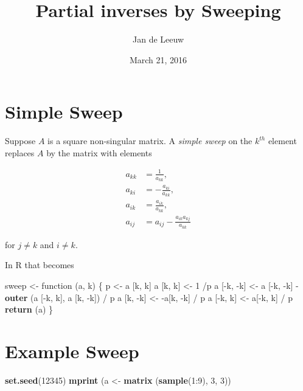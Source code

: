 \documentclass[]{article}
\title{Partial inverses by Sweeping}
\author{Jan de Leeuw}
\date{March 21, 2016}
\newenvironment{Shaded}{\begin{snugshade}}{\end{snugshade}}
\newcommand{\KeywordTok}[1]{\textcolor[rgb]{0.13,0.29,0.53}{\textbf{{#1}}}}
\newcommand{\DecValTok}[1]{\textcolor[rgb]{0.00,0.00,0.81}{{#1}}}
\newcommand{\StringTok}[1]{\textcolor[rgb]{0.31,0.60,0.02}{{#1}}}
\newcommand{\NormalTok}[1]{{#1}}
\begin{document}
\maketitle

{
\setcounter{tocdepth}{2}
\tableofcontents
}
\section{Simple Sweep}\label{simple-sweep}

Suppose \(A\) is a square non-singular matrix. A \emph{simple sweep} on
the \(k^{th}\) element replaces \(A\) by the matrix with elements

\begin{align*}
a_{kk}&=\frac{1}{a_{kk}},\\
a_{ki}&=-\frac{a_{ki}}{a_{kk}},\\
a_{ik}&=\frac{a_{ik}}{a_{kk}},\\
a_{ij}&=a_{ij}-\frac{a_{ik}a_{kj}}{a_{kk}}
\end{align*}

for \(j\not= k\) and \(i\not= k\).

In R that becomes

\begin{Shaded}
\begin{Highlighting}[]
\NormalTok{sweep <-}\StringTok{ }\NormalTok{function (a, k) \{}
  \NormalTok{p <-}\StringTok{ }\NormalTok{a [k, k] }
  \NormalTok{a [k, k] <-}\StringTok{ }\DecValTok{1} \NormalTok{/p}
  \NormalTok{a [-k, -k] <-}\StringTok{ }\NormalTok{a [-k, -k] -}\StringTok{ }\KeywordTok{outer} \NormalTok{(a [-k, k], a [k, -k]) /}\StringTok{ }\NormalTok{p}
  \NormalTok{a [k, -k] <-}\StringTok{ }\NormalTok{-a[k, -k] /}\StringTok{ }\NormalTok{p}
  \NormalTok{a [-k, k] <-}\StringTok{ }\NormalTok{a[-k, k] /}\StringTok{ }\NormalTok{p}
  \KeywordTok{return} \NormalTok{(a)}
\NormalTok{\}}
\end{Highlighting}
\end{Shaded}

\section{Example Sweep}\label{example-sweep}

\begin{Shaded}
\begin{Highlighting}[]
\KeywordTok{set.seed}\NormalTok{(}\DecValTok{12345}\NormalTok{)}
\KeywordTok{mprint} \NormalTok{(a <-}\StringTok{ }\KeywordTok{matrix} \NormalTok{(}\KeywordTok{sample}\NormalTok{(}\DecValTok{1}\NormalTok{:}\DecValTok{9}\NormalTok{), }\DecValTok{3}\NormalTok{, }\DecValTok{3}\NormalTok{))}
\end{Highlighting}
\end{Shaded}
\end{document}
